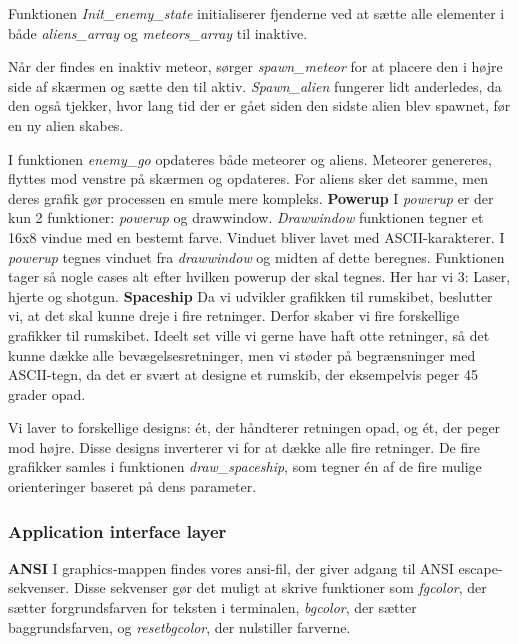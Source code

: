 Funktionen \textit{Init\_enemy\_state} initialiserer fjenderne ved at sætte alle elementer i både \textit{aliens\_array} og \textit{meteors\_array} til inaktive.

Når der findes en inaktiv meteor, sørger \textit{spawn\_meteor} for at placere den i højre side af skærmen og sætte den til aktiv. \textit{Spawn\_alien} fungerer lidt anderledes, da den også tjekker, hvor lang tid der er gået siden den sidste alien blev spawnet, før en ny alien skabes.

I funktionen \textit{enemy\_go} opdateres både meteorer og aliens. Meteorer genereres, flyttes mod venstre på skærmen og opdateres. For aliens sker det samme, men deres grafik gør processen en smule mere kompleks.
\newline
\textbf{Powerup}
\newline
I \textit{powerup} er der kun 2 funktioner: \textit{powerup} og drawwindow. \textit{Drawwindow} funktionen tegner et 16x8 vindue med en bestemt farve. Vinduet bliver lavet med ASCII-karakterer. I \textit{powerup} tegnes vinduet fra \textit{drawwindow} og midten af dette beregnes. Funktionen tager så nogle cases alt efter hvilken powerup der skal tegnes. Her har vi 3: Laser, hjerte og shotgun.
\newline
\textbf{Spaceship}
\newline
Da vi udvikler grafikken til rumskibet, beslutter vi, at det skal kunne dreje i fire retninger. Derfor skaber vi fire forskellige grafikker til rumskibet. Ideelt set ville vi gerne have haft otte retninger, så det kunne dække alle bevægelsesretninger, men vi støder på begrænsninger med ASCII-tegn, da det er svært at designe et rumskib, der eksempelvis peger 45 grader opad.

Vi laver to forskellige designs: ét, der håndterer retningen opad, og ét, der peger mod højre. Disse designs inverterer vi for at dække alle fire retninger. De fire grafikker samles i funktionen \textit{draw\_spaceship}, som tegner én af de fire mulige orienteringer baseret på dens parameter.
\newline

\subsubsection{Application interface layer}
\textbf{ANSI}
\newline
I graphics-mappen findes vores ansi-fil, der giver adgang til ANSI escape-sekvenser. Disse sekvenser gør det muligt at skrive funktioner som \textit{fgcolor}, der sætter forgrundsfarven for teksten i terminalen, \textit{bgcolor}, der sætter baggrundsfarven, og \textit{resetbgcolor}, der nulstiller farverne.

